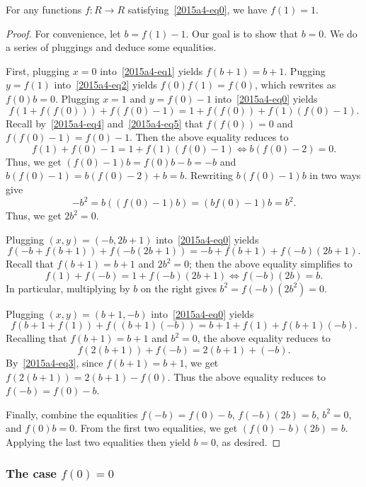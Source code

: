 \begin{claim}
For any functions $f : R \to R$ satisfying~\eqref{2015a4-eq0}, we have $f(1) = 1$.
\end{claim}
\begin{proof}
For convenience, let $b = f(1) - 1$.
Our goal is to show that $b = 0$.
We do a series of pluggings and deduce some equalities.

First, plugging $x = 0$ into~\eqref{2015a4-eq1} yields $f(b + 1) = b + 1$.
Pugging $y = f(1)$ into~\eqref{2015a4-eq2} yields $f(0) f(1) = f(0)$, which rewrites as $f(0) b = 0$.
Plugging $x = 1$ and $y = f(0) - 1$ into~\eqref{2015a4-eq0} yields
\[ f(1 + f(f(0))) + f(f(0) - 1) = 1 + f(f(0)) + f(1) (f(0) - 1). \]
Recall by~\eqref{2015a4-eq4} and~\eqref{2015a4-eq5} that $f(f(0)) = 0$ and $f(f(0) - 1) = f(0) - 1$.
Then the above equality reduces to
\[ f(1) + f(0) - 1 = 1 + f(1) (f(0) - 1) \iff b(f(0) - 2) = 0. \]
Thus, we get $(f(0) - 1) b = f(0) b - b = -b$ and $b(f(0) - 1) = b(f(0) - 2) + b = b$.
Rewriting $b (f(0) - 1) b$ in two ways give
\[ -b^2 = b ((f(0) - 1) b) = (b f(0) - 1) b = b^2. \]
Thus, we get $2b^2 = 0$.

Plugging $(x, y) = (-b, 2b + 1)$ into~\eqref{2015a4-eq0} yields
\[ f(-b + f(b + 1)) + f(-b(2b + 1)) = -b + f(b + 1) + f(-b) (2b + 1). \]
Recall that $f(b + 1) = b + 1$ and $2b^2 = 0$; then the above equality simplifies to
\[ f(1) + f(-b) = 1 + f(-b) (2b + 1) \iff f(-b) (2b) = b. \]
In particular, multiplying by $b$ on the right gives $b^2 = f(-b)(2b^2) = 0$.

Plugging $(x, y) = (b + 1, -b)$ into~\eqref{2015a4-eq0} yields
\[ f(b + 1 + f(1)) + f((b + 1)(-b)) = b + 1 + f(1) + f(b + 1)(-b). \]
Recalling that $f(b + 1) = b + 1$ and $b^2 = 0$, the above equality reduces to
\[ f(2(b + 1)) + f(-b) = 2(b + 1) + (-b). \]
By~\eqref{2015a4-eq3}, since $f(b + 1) = b + 1$, we get $f(2(b + 1)) = 2(b + 1) - f(0)$.
Thus the above equality reduces to $f(-b) = f(0) - b$.

Finally, combine the equalities $f(-b) = f(0) - b$, $f(-b)(2b) = b$, $b^2 = 0$, and $f(0) b = 0$.
From the first two equalities, we get $(f(0) - b)(2b) = b$.
Applying the last two equalities then yield $b = 0$, as desired.
\end{proof}



\subsubsection*{The case $f(0) = 0$}


